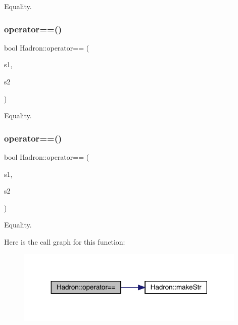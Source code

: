 Equality. 

\mbox{\label{namespaceHadron_ac884c28242a0aaf83a23169ef8ff5b2b}} 
\subsubsection{\texorpdfstring{operator==()}{operator==()}\hspace{0.1cm}{\footnotesize\ttfamily [3/5]}}
{\footnotesize\ttfamily bool Hadron\+::operator== (\begin{DoxyParamCaption}\item[{const \mbox{\hyperlink{structHadron_1_1KeyHadronNPartNPtConnGraph__t}{Key\+Hadron\+N\+Part\+N\+Pt\+Conn\+Graph\+\_\+t}} \&}]{s1,  }\item[{const \mbox{\hyperlink{structHadron_1_1KeyHadronNPartNPtConnGraph__t}{Key\+Hadron\+N\+Part\+N\+Pt\+Conn\+Graph\+\_\+t}} \&}]{s2 }\end{DoxyParamCaption})}



Equality. 

\mbox{\label{namespaceHadron_af09f672981980cb11de931b95576f828}} 
\subsubsection{\texorpdfstring{operator==()}{operator==()}\hspace{0.1cm}{\footnotesize\ttfamily [4/5]}}
{\footnotesize\ttfamily bool Hadron\+::operator== (\begin{DoxyParamCaption}\item[{const \mbox{\hyperlink{structHadron_1_1HadronVertex__t}{Hadron\+Vertex\+\_\+t}} \&}]{s1,  }\item[{const \mbox{\hyperlink{structHadron_1_1HadronVertex__t}{Hadron\+Vertex\+\_\+t}} \&}]{s2 }\end{DoxyParamCaption})}



Equality. 

Here is the call graph for this function\+:\nopagebreak
\begin{figure}[H]
\begin{center}
\leavevmode
\includegraphics[width=311pt]{d1/daf/namespaceHadron_af09f672981980cb11de931b95576f828_cgraph}
\end{center}
\end{figure}
\mbox{\label{namespaceHadron_a9eb9233a6f185d9919fc72243524ee67}} 
